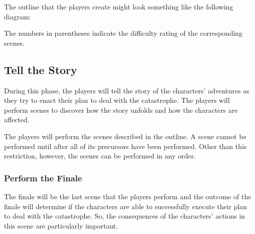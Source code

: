\documentclass[12pt, a5paper, parskip=half-]{scrartcl}
\begin{document}
The outline that the players create might look something like the following diagram:
\smallskip
\begin{center}
\end{center}
\smallskip
The numbers in parentheses indicate the difficulty rating of the corresponding scenes. 

\newpage

\subsection*{Tell the Story} \label{subsection:tell-the-story}
During this phase, the players will tell the story of the characters' adventures as they try to enact their plan to deal with the catastrophe.
The players will perform scenes to discover how the story unfolds and how the characters are affected.

The players will perform the scenes described in the outline.
A scene cannot be performed until after all of its precursors have been performed.
Other than this restriction, however, the scenes can be performed in any order.

\subsubsection*{Perform the Finale} \label{subsubsection:perform-the-finale}
The finale will be the last scene that the players perform and the outcome of the finale will determine if the characters are able to successfully execute their plan to deal with the catastrophe.
So, the consequences of the characters' actions in this scene are particularly important.
\end{document}
